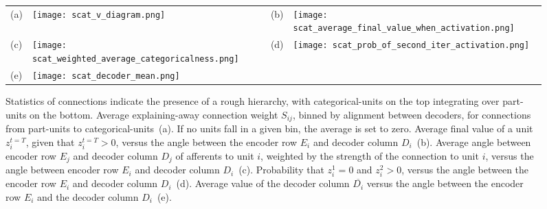 \documentclass{article} %
\newcommand{\nobfhid}{z}
\begin{document}
\begin{figure}[ptb] %
  \begin{center}
    \begin{tabular}{p{0.04in}p{2.4in}p{0.04in}p{2.4in}}
      \parbox[b]{0in}{(a) \vspace{3.8cm}} & \texttt{[image: scat\_v\_diagram.png]} &
      \parbox[b]{0in}{(b) \vspace{3.8cm}} & \texttt{[image: scat\_average\_final\_value\_when\_activation.png]} \\
      \parbox[b]{0in}{(c) \vspace{3.8cm}} & \texttt{[image: scat\_weighted\_average\_categoricalness.png]} &
      \parbox[b]{0in}{(d) \vspace{3.8cm}} & \texttt{[image: scat\_prob\_of\_second\_iter\_activation.png]} \\
      \parbox[b]{0in}{(e) \vspace{3.8cm}} & \texttt{[image: scat\_decoder\_mean.png]}
    \end{tabular}
  \end{center}
  \caption{Statistics of connections indicate the presence of a rough hierarchy, with categorical-units on the top integrating %
    over part-units on the bottom. Average explaining-away connection weight $S_{ij}$, binned by alignment between decoders, for connections from part-units to categorical-units~(a).  If no units fall in a given bin, the average is set to zero. Average final value of a unit $\nobfhid_i^{t = T}$, given that $\nobfhid_i^{t=T} > 0$, versus the angle between the encoder row $E_i$ and decoder column $D_i$~(b).  Average angle between encoder row $E_j$ and decoder column $D_j$ of afferents to unit $i$, weighted by the strength of the connection to unit $i$, versus the angle between encoder row $E_i$ and decoder column $D_i$~(c). Probability that $\nobfhid_i^1 = 0$ and $\nobfhid_i^2 > 0$, versus the angle between the encoder row $E_i$ and decoder column $D_i$~(d).  Average value of the decoder column $\overline{D_i}$ versus the angle between the encoder row $E_i$ and the decoder column $D_i$~(e). \label{categorical_connection_statistics_figure}}  
\end{figure}

\begin{comment}
\begin{figure}[ptb] %
  \begin{center}
    \begin{tabular}{cc}
      \texttt{[image: scat\_decoder\_mean.png]} &
      \texttt{[image: scat\_class\_dict\_mag\_versus\_final\_activation.png]}
    \end{tabular}
  \end{center}
  \caption{Statistics for interpretation. \label{interpretation_statistics_figure}}
\end{figure}
\end{comment}
\end{document}
